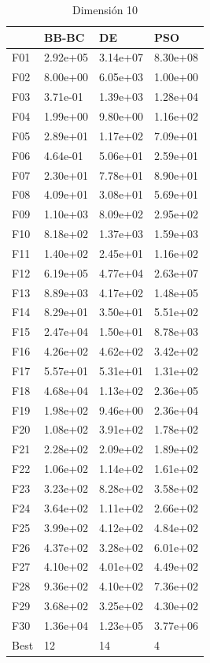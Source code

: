 \begin{table}[H]
    \begin{minipage}{.5\linewidth}
      \caption{Dimensión 10}
      \centering
      \begin{tabular}{llll}
        \toprule
        {} &     BB-BC &        DE &       PSO \\
        \midrule
        F01  &  2.92e+05 &  3.14e+07 &  8.30e+08 \\
        F02  &  8.00e+00 &  6.05e+03 &  1.00e+00 \\
        F03  &  3.71e-01 &  1.39e+03 &  1.28e+04 \\
        F04  &  1.99e+00 &  9.80e+00 &  1.16e+02 \\
        F05  &  2.89e+01 &  1.17e+02 &  7.09e+01 \\
        F06  &  4.64e-01 &  5.06e+01 &  2.59e+01 \\
        F07  &  2.30e+01 &  7.78e+01 &  8.90e+01 \\
        F08  &  4.09e+01 &  3.08e+01 &  5.69e+01 \\
        F09  &  1.10e+03 &  8.09e+02 &  2.95e+02 \\
        F10  &  8.18e+02 &  1.37e+03 &  1.59e+03 \\
        F11  &  1.40e+02 &  2.45e+01 &  1.16e+02 \\
        F12  &  6.19e+05 &  4.77e+04 &  2.63e+07 \\
        F13  &  8.89e+03 &  4.17e+02 &  1.48e+05 \\
        F14  &  8.29e+01 &  3.50e+01 &  5.51e+02 \\
        F15  &  2.47e+04 &  1.50e+01 &  8.78e+03 \\
        F16  &  4.26e+02 &  4.62e+02 &  3.42e+02 \\
        F17  &  5.57e+01 &  5.31e+01 &  1.31e+02 \\
        F18  &  4.68e+04 &  1.13e+02 &  2.36e+05 \\
        F19  &  1.98e+02 &  9.46e+00 &  2.36e+04 \\
        F20  &  1.08e+02 &  3.91e+02 &  1.78e+02 \\
        F21  &  2.28e+02 &  2.09e+02 &  1.89e+02 \\
        F22  &  1.06e+02 &  1.14e+02 &  1.61e+02 \\
        F23  &  3.23e+02 &  8.28e+02 &  3.58e+02 \\
        F24  &  3.64e+02 &  1.11e+02 &  2.66e+02 \\
        F25  &  3.99e+02 &  4.12e+02 &  4.84e+02 \\
        F26  &  4.37e+02 &  3.28e+02 &  6.01e+02 \\
        F27  &  4.10e+02 &  4.01e+02 &  4.49e+02 \\
        F28  &  9.36e+02 &  4.10e+02 &  7.36e+02 \\
        F29  &  3.68e+02 &  3.25e+02 &  4.30e+02 \\
        F30  &  1.36e+04 &  1.23e+05 &  3.77e+06 \\
        Best &        12 &        14 &         4 \\
        \bottomrule
        \end{tabular}
        

\end{minipage}
\end{table}
